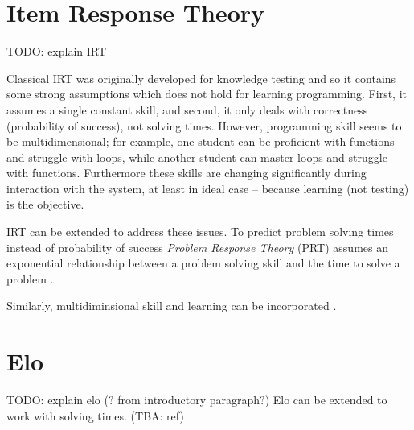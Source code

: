 
\section{Item Response Theory}
\label{sec:irt}

TODO: explain IRT


Classical IRT was originally developed for knowledge testing
  and so it contains some strong assumptions which does not hold for learning programming.
First, it assumes a single constant skill, and
second, it only deals with correctness (probability of success), not solving times.
However, programming skill seems to be multidimensional;
  for example, one student can be proficient with functions and struggle with loops,
  while another student can master loops and struggle with functions.
Furthermore these skills are changing significantly during interaction with the system,
  at least in ideal case -- because learning (not testing) is the objective.

IRT can be extended to address these issues.
To predict problem solving times instead of probability of success
  \emph{Problem Response Theory} (PRT)
  assumes an exponential relationship between a problem solving skill
  and the time to solve a problem  %
  \cite{alg.problem-response-theory}.

Similarly, multidiminsional skill and learning can be incorporated
  \cite{pelanek-student-modeling-times}.

\section{Elo}
\label{sec:elo}

TODO: explain elo (? from introductory paragraph?) \cite{alg.elo}
Elo can be extended to work with solving times. (TBA: ref)

